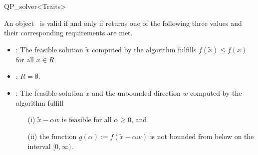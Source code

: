 \begin{ccRefClass}{QP_solver<Traits>}
\begin{ccIndexMemberFunctions}
\ccPredicates
{}





An object \ccVar\ is valid if and only if  returns
one of the following three values and their corresponding requirements
are met.
\begin{itemize}
\item {}: The feasible solution $\tilde{x}$ computed by the
algorithm fulfills $f(\tilde{x}) \leq f(x)$ for all $x \in R$.
\item {}: $R = \emptyset$.
\item {}: The feasible solution $\tilde{x}$ and the
unbounded direction $w$ computed by the algorithm fulfill
\begin{itemize}
\item[(i)] $\tilde{x}-\alpha w$ is feasible for all $\alpha\ge 0$, and
\item[(ii)] the function $g(\alpha):= f(\tilde{x}-\alpha w)$ is not
bounded from below on the interval $[0,\infty)$.
\end{itemize}
\end{itemize}




\end{ccIndexMemberFunctions}



\end{ccRefClass}
